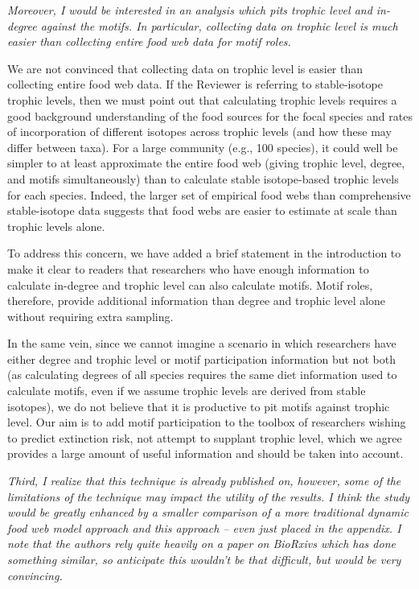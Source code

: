 \documentclass[12pt]{article}
\newcommand{\us}{\rm \setlength{\leftskip}{0.3cm} \setlength{\rightskip}{0.3cm}}
\newcommand{\them}{\it \setlength{\leftskip}{0cm} \setlength{\rightskip}{0cm}}
\begin{document}
        \them
        Moreover, I would be interested in an analysis which pits trophic level and in-degree against the motifs. In particular, collecting data on trophic level is much easier than collecting entire food web data for motif roles.
        
        \us
        We are not convinced that collecting data on trophic level is easier than collecting entire food web data. If the Reviewer is referring to stable-isotope trophic levels, then we must point out that calculating trophic levels requires a good background understanding of the food sources for the focal species and rates of incorporation of different isotopes across trophic levels (and how these may differ between taxa). For a large community (e.g., 100 species), it could well be simpler to at least approximate the entire food web (giving trophic level, degree, and motifs simultaneously) than to calculate stable isotope-based trophic levels for each species. Indeed, the larger set of empirical food webs than comprehensive stable-isotope data suggests that food webs are easier to estimate at scale than trophic levels alone.
        
        
        To address this concern, we have added a brief statement in the introduction to make it clear to readers that researchers who have enough information to calculate in-degree and trophic level can also calculate motifs. Motif roles, therefore, provide additional information than degree and trophic level alone without requiring extra sampling.
        
        
        In the same vein, since we cannot imagine a scenario in which researchers have either degree and trophic level or motif participation information but not both (as calculating degrees of all species requires the same diet information used to calculate motifs, even if we assume trophic levels are derived from stable isotopes), we do not believe that it is productive to pit motifs against trophic level. Our aim is to add motif participation to the toolbox of researchers wishing to predict extinction risk, not attempt to supplant trophic level, which we agree provides a large amount of useful information and should be taken into account.

        
        \them
        Third, I realize that this technique is already published on, however, some of the limitations of the technique may impact the utility of the results. I think the study would be greatly enhanced by a smaller comparison of a more traditional dynamic food web model approach and this approach – even just placed in the appendix. I note that the authors rely quite heavily on a paper on BioRxivs which has done something similar, so anticipate this wouldn't be that difficult, but would be very convincing.
        
\end{document}
